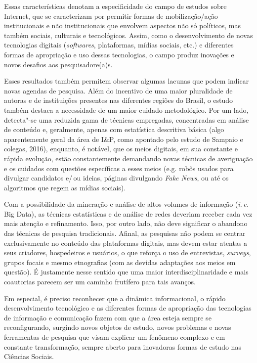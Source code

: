 Essas características denotam a especificidade do campo de estudos sobre
Internet, que se caracterizam por permitir formas de mobilização/ação
institucionais e não institucionais que envolvem aspectos não só
políticos, mas também sociais, culturais e tecnológicos. Assim, como o
desenvolvimento de novas tecnologias digitais (\emph{softwares},
plataformas, mídias sociais, etc.) e diferentes formas de apropriação e
uso dessas tecnologias, o campo produz inovações e novos desafios aos
pesquisadore(a)s.

Esses resultados também permitem observar algumas lacunas que podem
indicar novas agendas de pesquisa. Além do incentivo de uma maior
pluralidade de autoras e de instituições presentes nas diferentes
regiões do Brasil, o estudo também destaca a necessidade de um maior
cuidado metodológico. Por um lado, detecta"-se uma reduzida gama de
técnicas empregadas, concentradas em análise de conteúdo e, geralmente,
apenas com estatística descritiva básica (algo aparentemente geral da
área de I\&P, como apontado pelo estudo de Sampaio e colegas, 2016),
enquanto, é notável, que os meios digitais, em sua constante e rápida
evolução, estão constantemente demandando novas técnicas de averiguação
e os cuidados com questões específicas a esses meios (e.g. robôs usados
para divulgar candidatos e/\,ou ideias, páginas divulgando \emph{Fake
News}, ou até os algoritmos que regem as mídias sociais).

Com a possibilidade da mineração e análise de altos volumes de
informação (\textit{i.\,e.} Big Data), as técnicas estatísticas e de análise de
redes deveriam receber cada vez mais atenção e refinamento. Isso, por
outro lado, não deve significar o abandono das técnicas de pesquisa
tradicionais. Afinal, as pesquisas não podem se centrar exclusivamente
no conteúdo das plataformas digitais, mas devem estar atentas a seus
criadores, hospedeiros e usuários, o que reforça o uso de entrevistas,
\emph{surveys}, grupos focais e mesmo etnografias (com as devidas
adaptações aos meios em questão). É justamente nesse sentido que uma
maior interdisciplinaridade e mais coautorias parecem ser um caminho
frutífero para tais avanços.

Em especial, é preciso reconhecer que a dinâmica informacional, o rápido
desenvolvimento tecnológico e as diferentes formas de apropriação das
tecnologias de informação e comunicação fazem com que a área esteja
sempre se reconfigurando, surgindo novos objetos de estudo, novos
problemas e novas ferramentas de pesquisa que visam explicar um fenômeno
complexo e em constante transformação, sempre aberto para inovadoras
formas de estudo nas Ciências Sociais.

